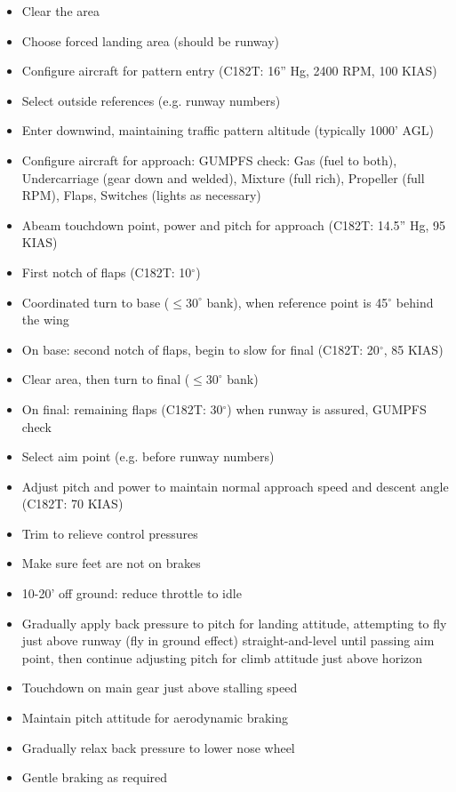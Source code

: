 \begin{itemize}
  \item Clear the area
  \item Choose forced landing area (should be runway)
  \item Configure aircraft for pattern entry (C182T: 16'' Hg, 2400 RPM, 100
    KIAS) 
  \item Select outside references (e.g. runway numbers)
  \item Enter downwind, maintaining traffic pattern altitude (typically 1000'
    AGL) 
  \item Configure aircraft for approach: GUMPFS check: Gas (fuel to both),
    Undercarriage (gear down and welded), Mixture (full rich), Propeller (full
    RPM), Flaps, Switches (lights as necessary)
  \item Abeam touchdown point, power and pitch for approach (C182T: 14.5'' Hg, 95
    KIAS)
  \item First notch of flaps (C182T: 10$^\circ$)
  \item Coordinated turn to base ($\leq 30^\circ$ bank), when reference point
    is 45$^\circ$ behind the wing
  \item On base: second notch of flaps, begin to slow for final (C182T:
    20$^\circ$, 85 KIAS)
  \item Clear area, then turn to final ($\leq 30^\circ$ bank)
  \item On final: remaining flaps (C182T: 30$^\circ$) when runway is assured,
    GUMPFS check
  \item Select aim point (e.g. before runway numbers)
  \item Adjust pitch and power to maintain normal approach speed and descent
    angle (C182T: 70 KIAS)
  \item Trim to relieve control pressures
  \item Make sure feet are not on brakes
  \item 10-20' off ground: reduce throttle to idle
  \item Gradually apply back pressure to pitch for landing attitude, attempting
    to fly just above runway (fly in ground effect) straight-and-level until
    passing aim point, then continue adjusting pitch for climb attitude just
    above horizon
  \item Touchdown on main gear just above stalling speed
  \item Maintain pitch attitude for aerodynamic braking
  \item Gradually relax back pressure to lower nose wheel
  \item Gentle braking as required
\end{itemize}

